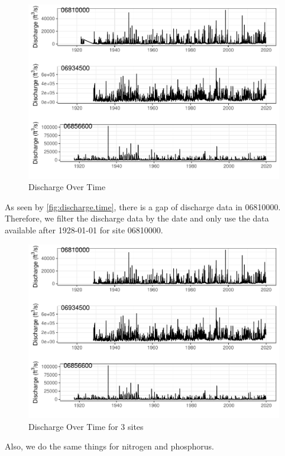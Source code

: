 \documentclass[12pt,]{article}
\begin{document}
\begin{figure}
\centering
\includegraphics{Project_Template_files/figure-latex/discharge.time-1.pdf}
\caption{\label{fig:discharge.time}Discharge Over Time}
\end{figure}

As seen by \autoref{fig:discharge.time}, there is a gap of discharge
data in 06810000. Therefore, we filter the discharge data by the date
and only use the data available after 1928-01-01 for site 06810000.

\begin{figure}
\centering
\includegraphics{Project_Template_files/figure-latex/dis.t3-1.pdf}
\caption{\label{fig:dis.t3}Discharge Over Time for 3 sites}
\end{figure}

Also, we do the same things for nitrogen and phosphorus.
\end{document}
